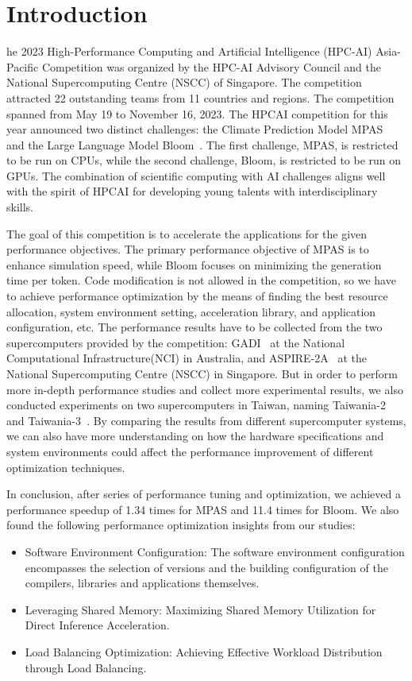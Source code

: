 \section{Introduction}
\label{sec:intro}

he 2023 High-Performance Computing and Artificial Intelligence (HPC-AI) Asia-Pacific Competition was organized by the HPC-AI Advisory Council and the National Supercomputing Centre (NSCC) of Singapore. The competition attracted 22 outstanding teams from 11 countries and regions. The competition spanned from May 19 to November 16, 2023. The HPCAI competition for this year announced two distinct challenges: the Climate Prediction Model MPAS~\cite{mpas} and the Large Language Model Bloom~\cite{Bloom-model}. The first challenge, MPAS, is restricted to be run on CPUs, while the second challenge, Bloom, is restricted to be run on GPUs. The combination of scientific computing with AI challenges aligns well with the spirit of HPCAI for developing young talents with interdisciplinary skills.

The goal of this competition is to accelerate the applications for the given performance objectives. The primary performance objective of MPAS is to enhance simulation speed, while Bloom focuses on minimizing the generation time per token. Code modification is not allowed in the competition, so we have to achieve performance optimization by the means of finding the best resource allocation, system environment setting, acceleration library, and application configuration, etc. The performance results have to be collected from the two supercomputers provided by the competition: GADI~\cite{gadi} at the
National Computational Infrastructure(NCI) in Australia, and ASPIRE-2A~\cite{aspire-2a} at the National Supercomputing Centre
(NSCC) in Singapore. But in order to perform more in-depth performance studies and collect more experimental results, we also conducted experiments on two supercomputers in Taiwan, naming Taiwania-2~\cite{taiwania} and Taiwania-3~\cite{taiwania}. By comparing the results from different supercomputer systems, we can also have more understanding on how the hardware specifications and system environments could affect the performance improvement of different optimization techniques. 

In conclusion, after series of performance tuning and optimization, we achieved  a performance speedup of 1.34 times for MPAS and 11.4 times for Bloom. We also found the following performance optimization insights from our studies:
\begin{itemize}
    \item Software Environment Configuration: The software environment configuration encompasses the selection of versions and the building configuration of the compilers, libraries and applications themselves.
    \item Leveraging Shared Memory: Maximizing Shared Memory Utilization for Direct Inference Acceleration.
    \item Load Balancing Optimization: Achieving Effective Workload Distribution through Load Balancing.
\end{itemize}


